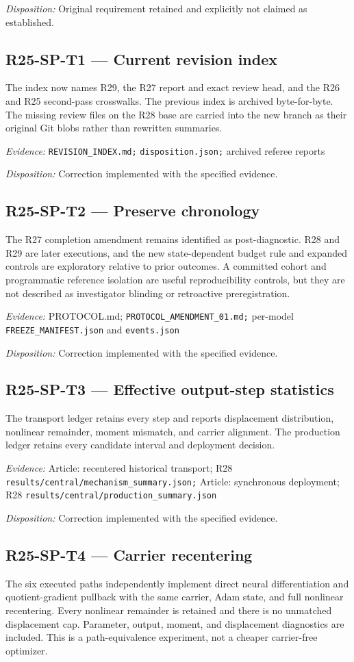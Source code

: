 \emph{Disposition:} Original requirement retained and explicitly not claimed as established.
\subsection{R25-SP-T1 --- Current revision index}
The index now names R29, the R27 report and exact review head, and the R26 and R25 second-pass crosswalks. The previous index is archived byte-for-byte. The missing review files on the R28 base are carried into the new branch as their original Git blobs rather than rewritten summaries.

\emph{Evidence:} \nolinkurl{REVISION_INDEX.md;} \nolinkurl{disposition.json;} archived referee reports

\emph{Disposition:} Correction implemented with the specified evidence.
\subsection{R25-SP-T2 --- Preserve chronology}
The R27 completion amendment remains identified as post-diagnostic. R28 and R29 are later executions, and the new state-dependent budget rule and expanded controls are exploratory relative to prior outcomes. A committed cohort and programmatic reference isolation are useful reproducibility controls, but they are not described as investigator blinding or retroactive preregistration.

\emph{Evidence:} PROTOCOL.md; \nolinkurl{PROTOCOL_AMENDMENT_01.md;} per-model \nolinkurl{FREEZE_MANIFEST.json} and \nolinkurl{events.json}

\emph{Disposition:} Correction implemented with the specified evidence.
\subsection{R25-SP-T3 --- Effective output-step statistics}
The transport ledger retains every step and reports displacement distribution, nonlinear remainder, moment mismatch, and carrier alignment. The production ledger retains every candidate interval and deployment decision.

\emph{Evidence:} Article: recentered historical transport; R28 \nolinkurl{results/central/mechanism_summary.json;} Article: synchronous deployment; R28 \nolinkurl{results/central/production_summary.json}

\emph{Disposition:} Correction implemented with the specified evidence.
\subsection{R25-SP-T4 --- Carrier recentering}
The six executed paths independently implement direct neural differentiation and quotient-gradient pullback with the same carrier, Adam state, and full nonlinear recentering. Every nonlinear remainder is retained and there is no unmatched displacement cap. Parameter, output, moment, and displacement diagnostics are included. This is a path-equivalence experiment, not a cheaper carrier-free optimizer.

